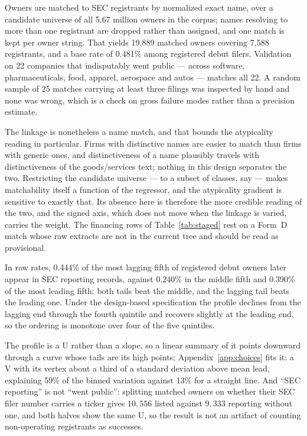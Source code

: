 Owners are matched to SEC
registrants by normalized exact name, over a candidate universe of all
5.67 million owners in the corpus; names resolving to more than one
registrant are dropped rather than assigned, and one match is kept per owner
string. That yields 19{,}889 matched owners covering 7{,}588 registrants, and
a base rate of 0.481\% among registered debut filers. Validation on 22
companies that indisputably went public --- across software,
pharmaceuticals, food, apparel, aerospace and autos --- matches all 22. A random sample of 25 matches
carrying at least three filings was inspected by hand and none was wrong,
which is a check on gross failure modes rather than a precision estimate.

The linkage is nonetheless a name match, and that bounds the atypicality
reading in particular. Firms with distinctive names are easier to match than
firms with generic ones, and distinctiveness of a name plausibly travels with
distinctiveness of the goods/services text; nothing in this design separates
the two. Restricting the candidate universe --- to a subset of classes, say
--- makes matchability itself a function of the regressor, and the
atypicality gradient is sensitive to exactly that. Its absence here is
therefore the more credible reading of the two, and the signed axis, which
does not move when the linkage is varied, carries the weight. The financing
rows of Table~\ref{tab:staged} rest on a Form~D match whose raw extracts are
not in the current tree and should be read as provisional.

In raw rates, 0.444\% of the most
lagging fifth of registered debut owners later appear in SEC reporting
records, against 0.240\% in the middle fifth and 0.390\% of the most leading
fifth: both tails beat the middle, and the lagging tail beats the leading
one. Under the design-based specification the profile declines from the
lagging end through the fourth quintile and recovers slightly at the leading
end, so the ordering is monotone over four of the five quintiles.

The profile is a U rather than a slope, so a linear
summary of it points downward through a curve whose tails are its high
points; Appendix~\ref{app:choices} fits it: a V with its vertex about a
third of a standard deviation above mean lead, explaining 59\% of the binned
variation against 13\% for a straight line. And ``SEC reporting'' is
not ``went public'': splitting matched owners on whether their SEC filer number carries a
ticker gives $10{,}556$ listed against $9{,}333$ reporting without one, and
both halves show the same U, so the result is not an artifact of counting
non-operating registrants as successes.

